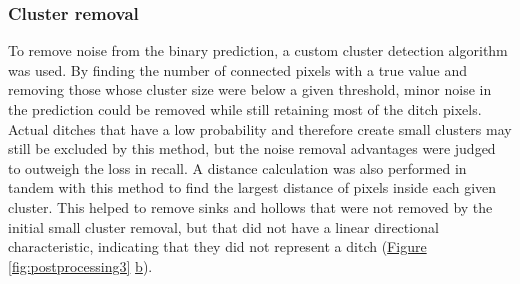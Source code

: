 \documentclass[11pt, review]{elsarticle} %
\begin{document}
\subsubsection{Cluster removal}
To remove noise from the binary prediction, a custom cluster detection algorithm was used. By finding the number of connected pixels with a true value and removing those whose cluster size were below a given threshold, minor noise in the prediction could be removed while still retaining most of the ditch pixels. Actual ditches that have a low probability and therefore create small clusters may still be excluded by this method, but the noise removal advantages were judged to outweigh the loss in recall. A distance calculation was also performed in tandem with this method to find the largest distance of pixels inside each given cluster. This helped to remove sinks and hollows that were not removed by the initial small cluster removal, but that did not have a linear directional characteristic, indicating that they did not represent a ditch (\hyperref[fig:postprocessing3]{Figure} \ref{fig:postprocessing3} \hyperref[fig:postprocessing3]{b}).
\end{document}
